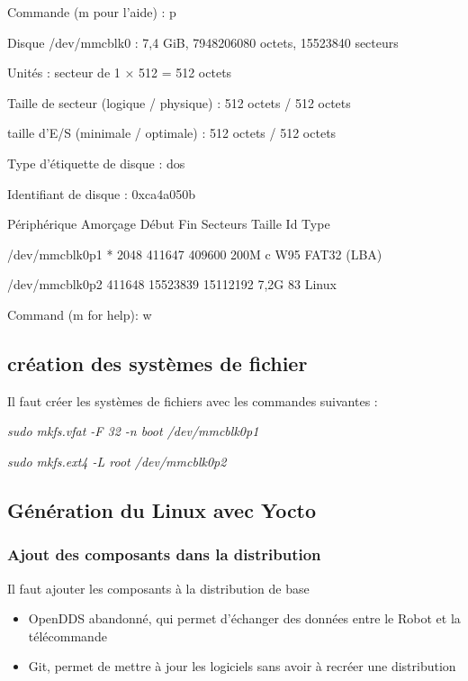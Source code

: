 {\begin{minipage}{0.9\textwidth}
Commande (m pour l'aide) : p

Disque /dev/mmcblk0 : 7,4 GiB, 7948206080 octets, 15523840 secteurs

Unités : secteur de 1 × 512 = 512 octets

Taille de secteur (logique / physique) : 512 octets / 512 octets

taille d'E/S (minimale / optimale) : 512 octets / 512 octets

Type d'étiquette de disque : dos

Identifiant de disque : 0xca4a050b



Périphérique Amorçage Début Fin Secteurs Taille Id Type

/dev/mmcblk0p1 * 2048 411647 409600 200M c W95 FAT32 (LBA)

/dev/mmcblk0p2 411648 15523839 15112192 7,2G 83 Linux





Command (m for help): w

\end{minipage}}

\subsection{création des systèmes de fichier}

Il faut créer les systèmes de fichiers avec les commandes suivantes : 


\textit{sudo mkfs.vfat -F 32 -n boot /dev/mmcblk0p1}

\textit{sudo mkfs.ext4 -L root /dev/mmcblk0p2}



\subsection{Génération du Linux avec Yocto}


\subsubsection{Ajout des composants dans la distribution}

Il faut ajouter les composants à la distribution de base
\begin{itemize}

\item OpenDDS abandonné, qui permet d'échanger des données entre le Robot et la télécommande

\item Git, permet de mettre à jour les logiciels sans avoir à recréer une distribution

\end{itemize}

